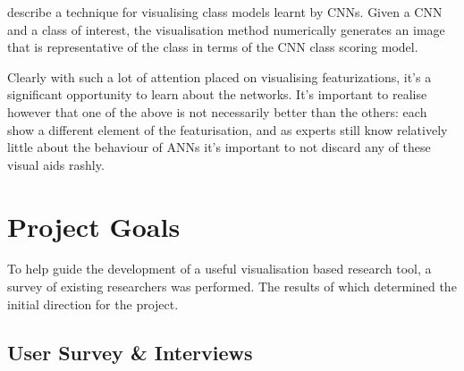 \documentclass[a4paper,11pt,titlepage]{article}
\begin{document}
		\par 
		\textbf{\cite{Simonyan2013}} describe a technique for visualising class models learnt by CNNs. Given a CNN and a class of interest, the visualisation method numerically generates an image that is representative of the class in terms of the CNN class scoring model.
		\par 
		Clearly with such a lot of attention placed on visualising featurizations, it's a significant opportunity to learn about the networks. It's important to realise however that one of the above is not necessarily better than the others: each show a different element of the featurisation, and as experts still know relatively little about the behaviour of ANNs it's important to not discard any of these visual aids rashly.

\clearpage 

\section{Project Goals}
	To help guide the development of a useful visualisation based research tool, a survey of existing researchers was performed. The results of which determined the initial direction for the project.
	\subsection{User Survey \& Interviews}
\end{document}
